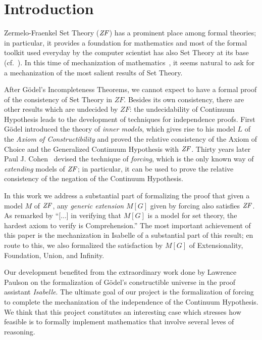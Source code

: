 \section{Introduction}
Zermelo-Fraenkel Set Theory ($\mathit{ZF}$) has a prominent place among formal
theories; in particular, it provides a foundation for mathematics and
most of the formal toolkit used everyday by the computer scientist has
also Set Theory at its base (cf.~\cite{paulson1995set}). In this time
of mechanization of mathematics~\cite{avigad2018mechanization}, it
seems natural to ask for a mechanization of the most salient results
of Set Theory.

After G\"odel's Incompleteness Theorems, we cannot expect to have a
formal proof of the consistency of Set Theory in $ZF$. Besides its own
consistency, there are other results which are undecided by $ZF$: the
undecidability of Continuum Hypothesis leads to the development of
techniques for independence proofs. First G\"odel introduced the
theory of \emph{inner models}, which gives rise to his model $L$ of
the \emph{Axiom of Constructibility} \cite{godel-L} and proved the
relative consistency of the Axiom of Choice and the Generalized
Continuum Hypothesis with $\mathit{ZF}$. Thirty years later Paul
J. Cohen~\cite{Cohen-CH-PNAS} devised the technique of \emph{forcing},
which is the only known way of \emph{extending} models of $\mathit{ZF}$; in
particular, it can be used to prove the relative consistency of the
negation of the Continuum Hypothesis. 

In this work we address a substantial part of formalizing the proof
that given a model $M$ of $\mathit{ZF}$, any \emph{generic extension} $M[G]$
given by forcing also satisfies $\mathit{ZF}$. As remarked by
\citet[][p.250]{kunen2011set} \enquote{[...] in verifying that $M[G]$
  is a model for set theory, the hardest axiom to verify is
  Comprehension.}  The most important achievement of this paper is the
mechanization in Isabelle of a substantial part of this result; en
route to this, we also formalized the satisfaction by $M[G]$ of
Extensionality, Foundation, Union, and Infinity. 

Our development benefited from the extraordinary work done by Lawrence
Paulson \cite{paulson_2003} on the formalization of G\"odel's
constructible universe in the proof assistant \emph{Isabelle}. The
ultimate goal of our project is the formalization of forcing to
complete the mechanization of the independence of the Continuum
Hypothesis. We think that this project constitutes an interesting case
which stresses how feasible is to formally implement mathematics that
involve several leves of reasoning.

